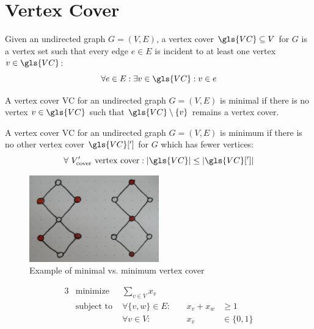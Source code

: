 \section{Vertex Cover}

\begin{definition}
  Given an undirected graph \(G=(V,E)\), a vertex cover
  \(\gls{VC} \subseteq V\) for \(G\) is a vertex set such that
  every edge \(e \in E\) is incident to at least one vertex
  \(v \in \gls{VC}\):
  \[ \forall e \in E: \exists v \in \gls{VC}: v \in e \]
\end{definition}


\begin{definition}
  A vertex cover \gls{VC} for an undirected graph
  \(G=(V,E)\) is minimal if there is no vertex
  \(v \in \gls{VC}\) such that
  \(\gls{VC} \setminus \{v\}\) remains a vertex cover.
\end{definition}


\begin{definition}
  A vertex cover \gls{VC} for an undirected graph
  \(G=(V,E)\) is minimum if there is no other vertex cover
  \(\gls{VC}[']\) for \(G\) which has fewer vertices:
  \[
    \forall~V_{\text{cover}}'\text{ vertex cover} :
    |\gls{VC}| \leq |\gls{VC}[']|
  \]
\end{definition}

\begin{figure}[ht]
  \centering
  \includegraphics[width=0.5\textwidth]{img/example_vertex_cover.jpg}
  \caption{\label{fig:example_vertex_cover}Example of minimal vs. minimum vertex cover}
\end{figure}


\begin{problem}
  \begin{alignat*}{3}
    &\text{minimize } & \sum\limits_{v \in V} x_v \\
    &\text{subject to } & \forall \{v,w\} \in E : &~& x_v + x_w &\geq 1 \\
    && \forall v \in V : &~& x_v &\in \{0,1\}
  \end{alignat*}
\end{problem}

